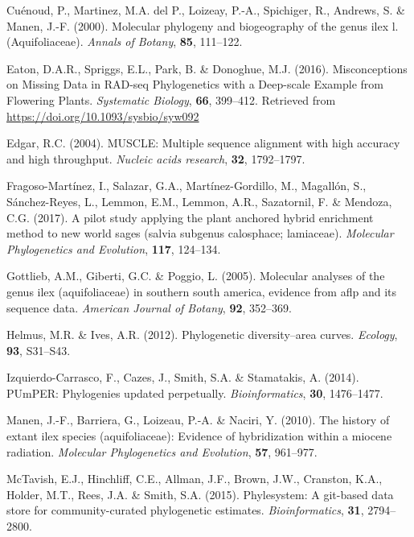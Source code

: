 \documentclass[]{article}
\begin{document}
\leavevmode\hypertarget{ref-cuenoud2000molecular}{}%
Cuénoud, P., Martinez, M.A. del P., Loizeay, P.-A., Spichiger, R., Andrews, S. \& Manen, J.-F. (2000). Molecular phylogeny and biogeography of the genus ilex l.(Aquifoliaceae). \emph{Annals of Botany}, \textbf{85}, 111--122.

\leavevmode\hypertarget{ref-eaton2016misconceptions}{}%
Eaton, D.A.R., Spriggs, E.L., Park, B. \& Donoghue, M.J. (2016). Misconceptions on Missing Data in RAD-seq Phylogenetics with a Deep-scale Example from Flowering Plants. \emph{Systematic Biology}, \textbf{66}, 399--412. Retrieved from \url{https://doi.org/10.1093/sysbio/syw092}

\leavevmode\hypertarget{ref-edgar2004muscle}{}%
Edgar, R.C. (2004). MUSCLE: Multiple sequence alignment with high accuracy and high throughput. \emph{Nucleic acids research}, \textbf{32}, 1792--1797.

\leavevmode\hypertarget{ref-fragoso2017pilot}{}%
Fragoso-Martínez, I., Salazar, G.A., Martínez-Gordillo, M., Magallón, S., Sánchez-Reyes, L., Lemmon, E.M., Lemmon, A.R., Sazatornil, F. \& Mendoza, C.G. (2017). A pilot study applying the plant anchored hybrid enrichment method to new world sages (salvia subgenus calosphace; lamiaceae). \emph{Molecular Phylogenetics and Evolution}, \textbf{117}, 124--134.

\leavevmode\hypertarget{ref-gottlieb2005molecular}{}%
Gottlieb, A.M., Giberti, G.C. \& Poggio, L. (2005). Molecular analyses of the genus ilex (aquifoliaceae) in southern south america, evidence from aflp and its sequence data. \emph{American Journal of Botany}, \textbf{92}, 352--369.

\leavevmode\hypertarget{ref-helmus2012phylogenetic}{}%
Helmus, M.R. \& Ives, A.R. (2012). Phylogenetic diversity--area curves. \emph{Ecology}, \textbf{93}, S31--S43.

\leavevmode\hypertarget{ref-izquierdo2014pumper}{}%
Izquierdo-Carrasco, F., Cazes, J., Smith, S.A. \& Stamatakis, A. (2014). PUmPER: Phylogenies updated perpetually. \emph{Bioinformatics}, \textbf{30}, 1476--1477.

\leavevmode\hypertarget{ref-manen2010history}{}%
Manen, J.-F., Barriera, G., Loizeau, P.-A. \& Naciri, Y. (2010). The history of extant ilex species (aquifoliaceae): Evidence of hybridization within a miocene radiation. \emph{Molecular Phylogenetics and Evolution}, \textbf{57}, 961--977.

\leavevmode\hypertarget{ref-mctavish2015phylesystem}{}%
McTavish, E.J., Hinchliff, C.E., Allman, J.F., Brown, J.W., Cranston, K.A., Holder, M.T., Rees, J.A. \& Smith, S.A. (2015). Phylesystem: A git-based data store for community-curated phylogenetic estimates. \emph{Bioinformatics}, \textbf{31}, 2794--2800.
\end{document}
